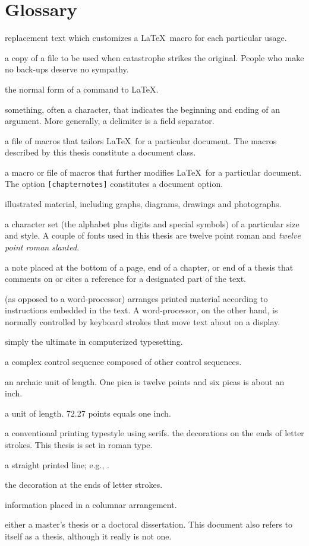 \documentclass [11pt, proquest] {uwthesis}[2020/02/24]
\begin{document}
\chapter*{Glossary}      %
\thispagestyle{plain}
%
\begin{glossary}
\item[argument] replacement text which customizes a \LaTeX\ macro for
each particular usage.
\item[back-up] a copy of a file to be used when catastrophe strikes
the original.  People who make no back-ups deserve
no sympathy.
\item[control sequence] the normal form of a command to \LaTeX.
\item[delimiter] something, often a character, that indicates
the beginning and ending of an argument.
More generally, a delimiter is a field separator.
\item[document class] a file of macros that tailors \LaTeX\ for
a particular document.  The macros described by this thesis
constitute a document class.
\item[document option] a macro or file of macros
that further modifies \LaTeX\ for
a particular document.  The option {\tt[chapternotes]}
constitutes a document option.
\item[figure] illustrated material, including graphs,
diagrams, drawings and photographs.
\item[font] a character set (the alphabet plus digits
and special symbols) of a particular size and style.  A couple of fonts
used in this thesis are twelve point roman and {\sl twelve point roman
slanted}.
\item[footnote] a note placed at the bottom of a page, end of a chapter,
or end of a thesis that comments on or cites a reference
for a designated part of the text.
\item[formatter] (as opposed to a word-processor) arranges printed
material according to instructions embedded in the text.
A word-processor, on the other hand, is normally controlled
by keyboard strokes that move text about on a display.
\item[\LaTeX] simply the ultimate in computerized typesetting.
\item[macro]  a complex control sequence composed of 
other control sequences.
\item[pica] an archaic unit of length.  One pica is twelve points and
six picas is about an inch.
\item[point] a unit of length.  72.27 points equals one inch.
\item[roman]  a conventional printing typestyle using serifs.
the decorations on the ends of letter strokes.
This thesis is set in roman type.
\item[rule] a straight printed line; e.g., \hrulefill.
\item[serif] the decoration at the ends of letter strokes.
\item[table] information placed in a columnar arrangement.
\item[thesis] either a master's thesis or a doctoral dissertation.
This document also refers to itself as a thesis, although it
really is not one.
 

\end{glossary}
\end{document}
